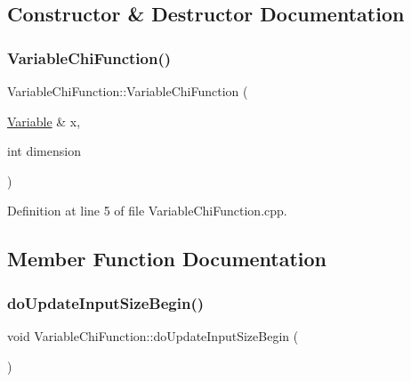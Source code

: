 \subsection{Constructor \& Destructor Documentation}
\hypertarget{classocra_1_1VariableChiFunction_ac83eecf18f118396efdb5513923eeba6}{}\label{classocra_1_1VariableChiFunction_ac83eecf18f118396efdb5513923eeba6} 
\subsubsection{\texorpdfstring{Variable\+Chi\+Function()}{VariableChiFunction()}}
{\footnotesize\ttfamily Variable\+Chi\+Function\+::\+Variable\+Chi\+Function (\begin{DoxyParamCaption}\item[{\hyperlink{classocra_1_1Variable}{Variable} \&}]{x,  }\item[{int}]{dimension }\end{DoxyParamCaption})}



Definition at line 5 of file Variable\+Chi\+Function.\+cpp.



\subsection{Member Function Documentation}
\hypertarget{classocra_1_1VariableChiFunction_ad58b8fbb68e8cb27aab585f40875918f}{}\label{classocra_1_1VariableChiFunction_ad58b8fbb68e8cb27aab585f40875918f} 
\subsubsection{\texorpdfstring{do\+Update\+Input\+Size\+Begin()}{doUpdateInputSizeBegin()}}
{\footnotesize\ttfamily void Variable\+Chi\+Function\+::do\+Update\+Input\+Size\+Begin (\begin{DoxyParamCaption}{ }\end{DoxyParamCaption})\hspace{0.3cm}{\ttfamily [virtual]}}


